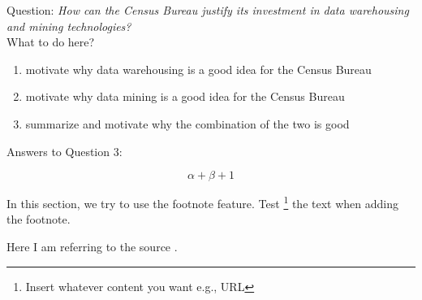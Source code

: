 Question:
\emph{
    How can the Census Bureau justify its investment in data warehousing and mining
technologies?
}\\

What to do here?
\begin{enumerate}
    \item motivate why data warehousing is a good idea for the Census Bureau
    \item motivate why data mining is a good idea for the Census Bureau
    \item summarize and motivate why the combination of the two is good 
  \end{enumerate}

Answers to Question 3:

\begin{equation}
\alpha + \beta + 1
\end{equation}

In this section, we try to use the footnote feature. Test \footnote{Insert whatever content you want e.g., URL} the text when adding the footnote.

Here I am referring to the source \cite{DataScience}.
